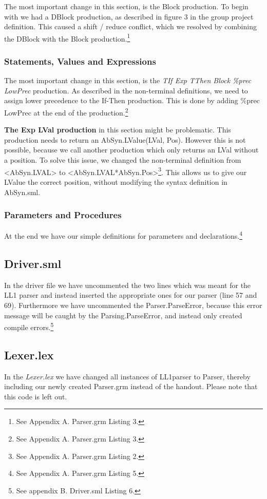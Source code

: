 \documentclass[12pt,a4paper,english]{article}
\begin{document}
The most important change in this section, is the Block production. To begin with we had a DBlock production, as described in figure 3 in the group project definition. This caused a shift / reduce conflict, which we resolved by combining the DBlock with the Block production.\footnote{See Appendix A. Parser.grm Listing 3.}

\subsubsection{Statements, Values and Expressions}
The most important change in this section, is the \textit{TIf Exp TThen Block \%prec LowPrec} production. As described in the non-terminal definitions, we need to assign lower precedence to the If-Then production. This is done by adding \%prec LowPrec at the end of the production.\footnote{See Appendix A. Parser.grm Listing 3.}

\textbf{The Exp LVal production} in this section might be problematic. This production needs to return an AbSyn.LValue(LVal, Pos). However this is not possible, because we call another production which only returns an LVal without a position. To solve this issue, we changed the non-terminal definition from <AbSyn.LVAL> to <AbSyn.LVAL*AbSyn.Pos>\footnote{See Appendix A.  Parser.grm Listing 2.}. This allows us to give our LValue the correct position, without modifying the syntax definition in AbSyn.sml.

\subsubsection{Parameters and Procedures}
At the end we have our simple definitions for parameters and declarations.\footnote{See Appendix A. Parser.grm Listing 5.}

\subsection{Driver.sml}
In the driver file we have uncommented the two lines which was meant for the LL1 parser and instead inserted the appropriate ones for our parser (line 57 and 69). Furthermore we have uncommented the Parser.ParseError, because this error message will be caught by the Parsing.ParseError, and instead only created compile errors.\footnote{See appendix B. Driver.sml Listing 6.}
\newpage
\subsection{Lexer.lex}
In the \textit{Lexer.lex} we have changed all instances of LL1parser to Parser, thereby including our newly created Parser.grm instead of the handout. Please note that this code is left out.
\end{document}

